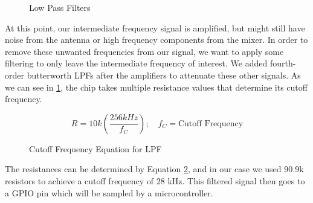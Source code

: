\begin{figure}[H]
  \centering
\caption{Low Pass Filters}
\label{img:lpf}
\end{figure}

At this point, our intermediate frequency signal is amplified, but might still have
noise from the antenna or high frequency components from the mixer. In order to remove
these unwanted frequencies from our signal, we want to apply some filtering to only leave
the intermediate frequency of interest. We added fourth-order butterworth LPFs after
the amplifiers to attenuate these other signals. As we can see in \ref{img:lpf}, the 
chip takes multiple resistance values that determine its cutoff frequency.

\begin{figure}[H]
  \begin{equation}
    R = 10k \left(\frac{256kHz}{f_C}\right); \quad f_C = \text{Cutoff Frequency}
    \end{equation}
    \caption{Cutoff Frequency Equation for LPF}
    \label{eq:LPF}
  \end{figure}

The resistances can be determined by Equation \ref{eq:LPF}, and in our case
we used 90.9k resistors to achieve a cutoff frequency of 28 kHz. This filtered
signal then goes to a GPIO pin which will be sampled by a microcontroller.
